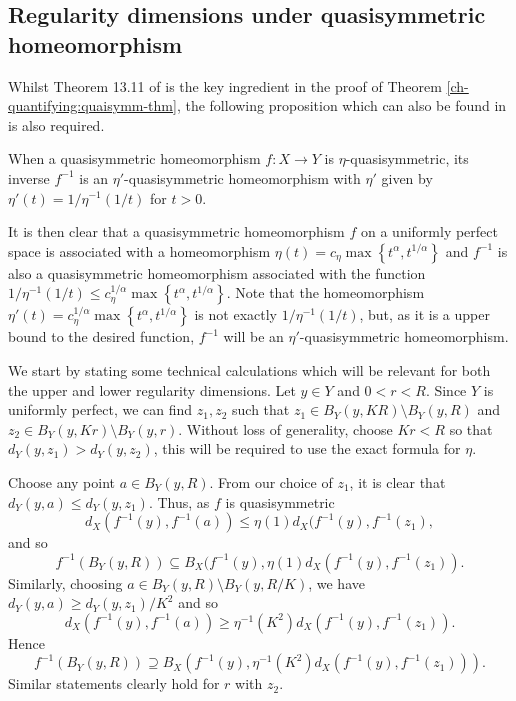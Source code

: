 \subsection{Regularity dimensions under quasisymmetric homeomorphism}\label{ch-quantifying:proof-quasi}


Whilst Theorem 13.11 of \cite{heinonen} is the key ingredient in the proof of Theorem \ref{ch-quantifying:quaisymm-thm}, the following proposition which can also be found in \cite{heinonen} is also required.

\begin{proposition}
	When a quasisymmetric homeomorphism $f\colon X \rightarrow Y$ is $\eta$-quasisymmetric, its inverse $f^{-1}$ is an $\eta'$-quasisymmetric homeomorphism with $\eta'$ given by  $\eta'(t) = 1/\eta^{-1}(1/t)$ for $t>0$.
\end{proposition}

It is then clear that a quasisymmetric homeomorphism $f$ on a uniformly perfect space is associated with a homeomorphism $\eta(t) = c_\eta\max\left\{t^\alpha, t^{1/\alpha}\right\}$ and $f^{-1}$ is also a quasisymmetric homeomorphism associated with the function $1/\eta^{-1}(1/t) \le c_\eta^{1/\alpha} \max\left\{t^\alpha, t^{1/\alpha} \right\}$. Note that the homeomorphism $\eta'(t) = c_\eta^{1/\alpha} \max\left\{t^\alpha, t^{1/\alpha} \right\}$ is not exactly $1/\eta^{-1}(1/t)$, but, as it is a upper bound to the desired function, $f^{-1}$ will be an $\eta'$-quasisymmetric homeomorphism.



We start by stating some technical calculations which will be relevant for both the upper and lower regularity dimensions. Let $y\in Y$ and $0<r<R$. Since $Y$ is uniformly perfect, we can find $z_1,z_2$ such that $z_1\in B_Y(y,KR) \setminus B_Y(y,R)$ and $z_2 \in B_Y(y,Kr) \setminus B_Y(y,r)$. Without loss of generality, choose $ Kr < R $ so that $d_Y(y,z_1) > d_Y(y,z_2)$,  this will be required to use the exact formula for $\eta$.
	
	
Choose any point $a \in B_Y(y,R)$. From our choice of $z_1$, it is clear that $d_Y( y , a ) \le d_Y(y , z_1)$. Thus, as $f$ is quasisymmetric 
$$d_X( f^{-1}(y) , f^{-1}(a) ) \le \eta(1)  d_X(f^{-1}(y) , f^{-1}(z_1), $$
and so 
\[
f^{-1}(B_Y(y,R)) \subseteq B_X(f^{-1}(y),\eta(1)d_X(f^{-1}(y), f^{-1}(z_1)).
\]
Similarly, choosing $a \in B_Y(y,R) \setminus B_Y(y,R/K)$, we have $d_Y( y , a ) \ge d_Y( y , z_1 )/K^2$ and so $$d_X( f^{-1}(y) , f^{-1}(a) ) \ge \eta^{-1}(K^2) d_X( f^{-1}(y) , f^{-1}(z_1) ).$$
Hence 
\[
f^{-1}(B_Y(y,R)) \supseteq B_X(f^{-1}(y),\eta^{-1}(K^2)d_X(f^{-1}(y),f^{-1}(z_1))).
\]
Similar statements clearly hold for $r$ with $z_2$. 


